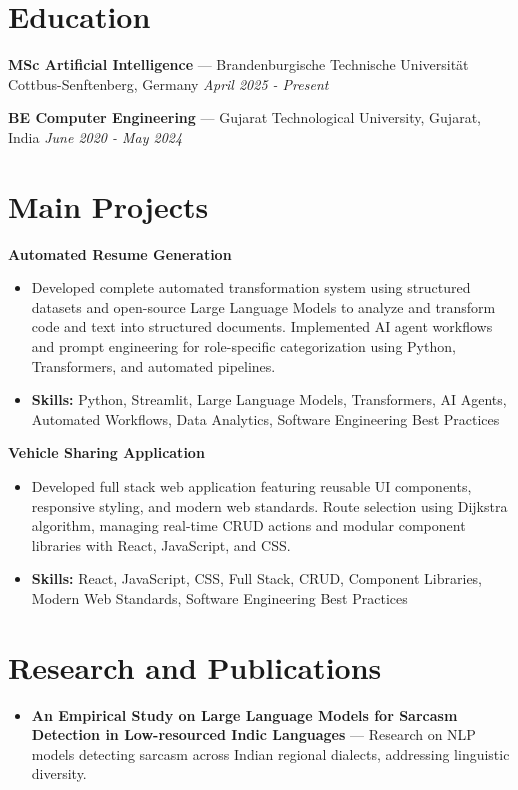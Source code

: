 \documentclass[a4paper,10pt]{article}
\begin{document}
\section*{Education}
\textbf{MSc Artificial Intelligence} — Brandenburgische Technische Universität Cottbus-Senftenberg, Germany \hfill \textit{April 2025 - Present}\par
\vspace{1.5pt}
\textbf{BE Computer Engineering} — Gujarat Technological University, Gujarat, India \hfill \textit{June 2020 - May 2024}\par

\section*{Main Projects}
\textbf{Automated Resume Generation}\par
\vspace{1pt}
\begin{itemize}
  \item Developed complete automated transformation system using structured datasets and open-source Large Language Models to analyze and transform code and text into structured documents. Implemented AI agent workflows and prompt engineering for role-specific categorization using Python, Transformers, and automated pipelines.
  \item \textbf{Skills:} Python, Streamlit, Large Language Models, Transformers, AI Agents, Automated Workflows, Data Analytics, Software Engineering Best Practices
\end{itemize}
\vspace{3pt}
\textbf{Vehicle Sharing Application}\par
\vspace{1pt}
\begin{itemize}
  \item Developed full stack web application featuring reusable UI components, responsive styling, and modern web standards. Route selection using Dijkstra algorithm, managing real-time CRUD actions and modular component libraries with React, JavaScript, and CSS.
  \item \textbf{Skills:} React, JavaScript, CSS, Full Stack, CRUD, Component Libraries, Modern Web Standards, Software Engineering Best Practices
\end{itemize}

\section*{Research and Publications}
\begin{itemize}
\item \textbf{An Empirical Study on Large Language Models for Sarcasm Detection in Low-resourced Indic Languages} — Research on NLP models detecting sarcasm across Indian regional dialects, addressing linguistic diversity.
\end{itemize}
\end{document}
